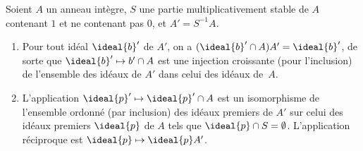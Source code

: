 \documentclass[11pt, useosf,
  title in boldface,
  theorem in new line,
  theorem numbering = section,
  number theorems separately,
]{simplivre}
\begin{document}
    \begin{proposition}\label{prop:localisation;correspondant}
        Soient \( A \) un anneau intègre, \( S \) une partie multiplicativement stable de \( A \) contenant \( 1 \) et ne contenant pas \( 0 \), et \( A' = S^{-1} A \).
        \begin{enumerate}
            \item \label{prop:localisation;correspondant;item1} Pour tout idéal \( \ideal{b}' \) de \( A' \), on a \( (\ideal{b}' \cap A) A' = \ideal{b}' \), de sorte que \( \ideal{b}' \mapsto {b}' \cap A \) est une injection croissante (pour l'inclusion) de l'ensemble des idéaux de \( A' \) dans celui des idéaux de~\( A \).
            \item \label{prop:localisation;correspondant;item2} L'application \( \ideal{p}' \mapsto \ideal{p}' \cap A \) est un isomorphisme de l'ensemble ordonné (par inclusion) des idéaux premiers de \( A' \) sur celui des idéaux premiers \( \ideal{p} \) de \( A \) tels que \( \ideal{p} \cap S = \emptyset \). L'application réciproque est \( \ideal{p} \mapsto \ideal{p}A' \).
        \end{enumerate}
    \end{proposition}
\end{document}
